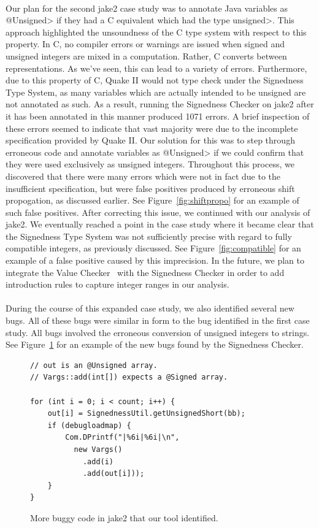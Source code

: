 \noindent\\
Our plan for the second jake2 case study was to annotate Java variables as
\<@Unsigned> if they had a C equivalent which had the type \<unsigned>. This
approach highlighted the unsoundness of the C type system with respect to this
property. In C, no compiler errors or warnings are issued when signed and
unsigned integers are mixed in a computation. Rather, C converts between
representations. As we've seen, this can lead to a variety
of errors. Furthermore, due to this property of C, Quake II would not type
check under the Signedness Type System, as many variables which are actually
intended to be unsigned are not annotated as such. As a result, running the
Signedness Checker on jake2 after it has been annotated in this manner
produced 1071 errors. A brief inspection of these errors seemed to indicate
that vast majority were due to the incomplete specification provided by
Quake II. Our solution for this was to step through erroneous code and annotate
variables as \<@Unsigned> if we could confirm that they were used exclusively
as unsigned integers. Throughout this process, we discovered that there
were many errors which were not in fact due to the insufficient specification,
but were false positives produced by erroneous shift propogation, as discussed
earlier. See Figure~\ref{fig:shiftpropo} for an example of such false positives.
After correcting this issue, we continued with our analysis of jake2.
We eventually reached a point in the case study where it became clear that the
Signedness Type System was not sufficiently precise with regard to fully
compatible integers, as previously discussed. See Figure~\ref{fig:compatible} for
an example of a false positive caused by this imprecision.
In the future, we plan to integrate the
Value Checker~\cite{ValueChecker} with the Signedness Checker in order to
add introduction rules to capture integer ranges in our analysis.\\
\\
During the course of this expanded case study, we also identified several new
bugs. All of these bugs were similar in form to the bug identified in the first
case study. All bugs involved the erroneous conversion of
unsigned integers to strings. See Figure~\ref{fig:morebugs} for an example of
the new bugs found by the Signedness Checker.

\begin{figure}[t]
\begin{lstlisting}
// out is an @Unsigned array.
// Vargs::add(int[]) expects a @Signed array.

for (int i = 0; i < count; i++) {
    out[i] = SignednessUtil.getUnsignedShort(bb);
    if (debugloadmap) {
        Com.DPrintf("|%6i|%6i|\n",
          new Vargs()
            .add(i)
            .add(out[i]));
    }
}
\end{lstlisting}
\vspace{-10pt}
\caption{More buggy code in jake2 that our tool identified.}
\label{fig:morebugs}
\end{figure}

